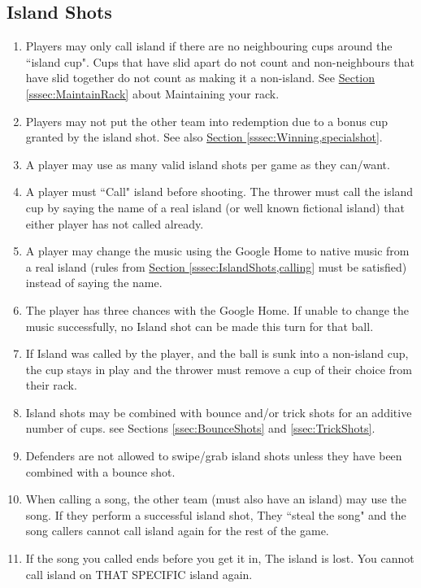 	\subsection{Island Shots}\label{ssec:IslandShots}
		\begin{enumerate}[label=(\roman*)]
            \item \label{sssec:IslandShots,conditon} Players may only call island if there are no neighbouring cups around the ``island cup".
                Cups that have slid apart do not count and non-neighbours that have slid together do not count as making it a non-island.
                See \hyperref[sssec:MaintainRack]{Section \ref{sssec:MaintainRack}} about Maintaining your rack.
            \item \label{sssec:IslandShots,winning} Players may not put the other team into redemption due to a bonus cup granted by the island shot.
                See also \hyperref[sssec:Winning,specialshot]{Section \ref{sssec:Winning,specialshot}}.
            \item \label{sssec:IslandShots,times} A player may use as many valid island shots per game as they can/want.
            \item \label{sssec:IslandShots,calling} A player must ``Call" island before shooting.
                The thrower must call the island cup by saying the name of a real island (or well known fictional island) that either player has not called already.
            \item \label{sssec:IslandShots,musicCalling} A player may change the music using the Google Home to native music from a real island (rules from \hyperref[sssec:IslandShots,calling]{Section \ref{sssec:IslandShots,calling}} must be satisfied) instead of saying the name.
            \item \label{sssec:IslandShots,musicAttempts} The player has three chances with the Google Home. If unable to change the music successfully, no Island shot can be made this turn for that ball.
            \item \label{sssec:IslandShots,missincup} If Island was called by the player, and the ball is sunk into a non-island cup, the cup stays in play and the thrower must remove a cup of their choice from their rack.	
            \item \label{sssec:IslandShots,combo} Island shots may be combined with bounce and/or trick shots for an additive number of cups.
                see Sections \ref{ssec:BounceShots} and \ref{ssec:TrickShots}.
            \item \label{sssec:IslandShots,swiping} Defenders are not allowed to swipe/grab island shots unless they have been combined with a bounce shot.
            \item \label{sssec:IslandShots,stelaing} When calling a  song, the other team (must also have an island) may use the song.
                If they perform a successful island shot, They ``steal the song" and the song callers cannot call island again for the rest of the game.
            \item \label{sssec:IslandShots,endsong} If the song you called ends before you get it in, The island is lost.
                You cannot call island on THAT SPECIFIC island again.
        \end{enumerate}
